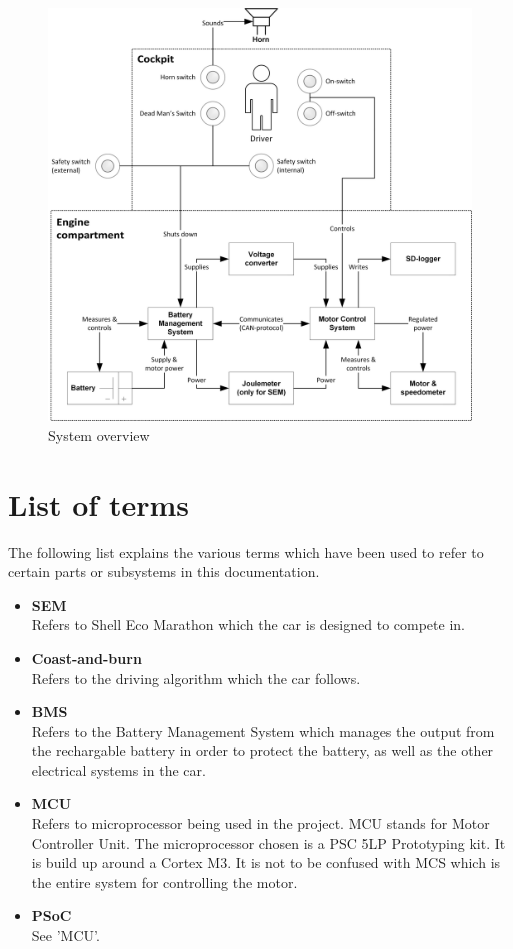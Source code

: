 \begin{figure}[H]
	\centering
	\includegraphics[width=1\linewidth]{Introduction/Overview}
	\caption{System overview}
	\label{fig:System_overview}
\end{figure}

\section{List of terms}
The following list explains the various terms which have been used to refer to certain parts or subsystems in this documentation.

\begin{itemize}
	\item \textbf{SEM}\\
	Refers to Shell Eco Marathon which the car is designed to compete in.
	\item \textbf{Coast-and-burn}\\
	Refers to the driving algorithm which the car follows.
	\item \textbf{BMS}\\
	Refers to the Battery Management System which manages the output from the rechargable battery in order to protect the battery, as well as the other electrical systems in the car.
	\item \textbf{MCU}\\
	Refers to microprocessor being used in the project. MCU stands for Motor Controller Unit. The microprocessor chosen is a PSC 5LP Prototyping kit. It is build up around a Cortex M3. It is not to be confused with MCS which is the entire system for controlling the motor. 
	\item \textbf{PSoC}\\
	See 'MCU'.
\end{itemize}